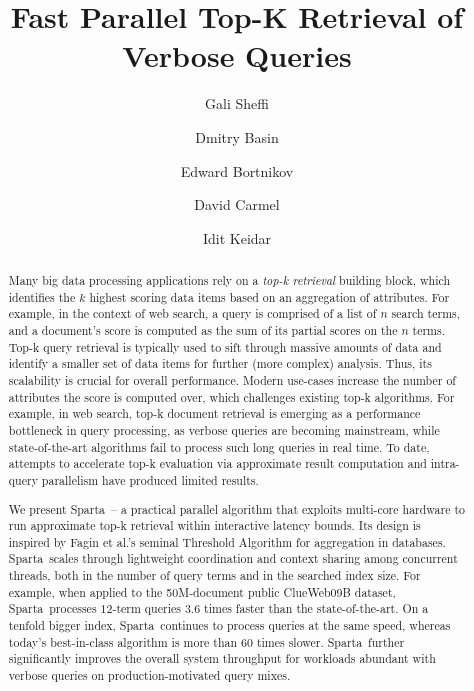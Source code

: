 \documentclass[sigplan,10pt,review,anonymous]{acmart}
\title{Fast Parallel Top-K Retrieval of Verbose Queries}
\author{Gali Sheffi}%
\author{Dmitry Basin}%
\author{Edward Bortnikov}%
\author{David Carmel}%
\author{Idit Keidar}%
\newcommand{\alg}{Sparta}
\begin{document}
\begin{abstract}



Many big data processing applications rely on a \emph{top-k retrieval} building block, which identifies the $k$ highest scoring data items based on an 
aggregation of attributes. For example, in the context of web search, a query is comprised of a list of $n$ search terms, and a document's score is computed as the sum 
of its partial scores on the $n$ terms. Top-k query retrieval is typically used to sift through massive amounts of data and identify a smaller set of data items for 
further (more complex) analysis. Thus, its scalability is crucial for overall performance. Modern use-cases increase the number of attributes the score is computed over, 
which challenges existing top-k algorithms. 
For example, in web search, top-k document retrieval is emerging as a performance bottleneck in query processing, as verbose queries are becoming 
mainstream, while state-of-the-art algorithms fail to process such long queries in real time. To date, attempts to
accelerate top-k evaluation via approximate result computation and intra-query parallelism have produced limited results. 

We present \alg\ -- a practical parallel algorithm that exploits multi-core hardware to run approximate top-k retrieval 
within interactive latency bounds. Its design is inspired by  Fagin et al.'s seminal Threshold Algorithm for  aggregation in databases. 
\alg\ scales through lightweight coordination and context sharing among concurrent threads,  
both in the number of query terms and in the searched index size. 
For example, when applied to the 50M-document public ClueWeb09B 
dataset, \alg\  processes $12$-term queries $3.6$ times faster than the state-of-the-art. 
On a tenfold  bigger index, 
\alg\ continues to process queries at the same speed, whereas today's best-in-class algorithm is more than 60 times slower. 
\alg\ further significantly improves the overall system throughput for workloads abundant with verbose queries  
on production-motivated query mixes. 
\end{abstract}


\maketitle








\clearpage

  
\end{document}
